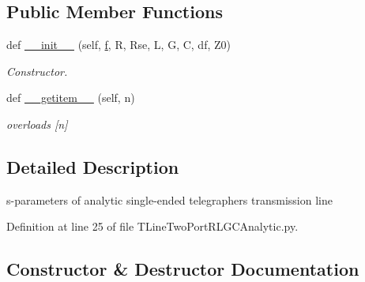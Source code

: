 \subsection*{Public Member Functions}
\begin{DoxyCompactItemize}
\item 
def \hyperlink{classSignalIntegrity_1_1SParameters_1_1Devices_1_1TLineTwoPortRLGCAnalytic_1_1TLineTwoPortRLGCAnalytic_a7bb4433ce4f16bca3d1fba761e3a1f9c}{\+\_\+\+\_\+init\+\_\+\+\_\+} (self, \hyperlink{classSignalIntegrity_1_1SParameters_1_1SParameters_1_1SParameters_a32e7a34d6837fe949b413c852a0447f8}{f}, R, Rse, L, G, C, df, Z0)
\begin{DoxyCompactList}\small\item\em Constructor. \end{DoxyCompactList}\item 
def \hyperlink{classSignalIntegrity_1_1SParameters_1_1Devices_1_1TLineTwoPortRLGCAnalytic_1_1TLineTwoPortRLGCAnalytic_ab7a6da5139e0878b590d68292aaa70f2}{\+\_\+\+\_\+getitem\+\_\+\+\_\+} (self, n)
\begin{DoxyCompactList}\small\item\em overloads \mbox{[}n\mbox{]} \end{DoxyCompactList}\end{DoxyCompactItemize}


\subsection{Detailed Description}
s-\/parameters of analytic single-\/ended telegraphers transmission line 

Definition at line 25 of file T\+Line\+Two\+Port\+R\+L\+G\+C\+Analytic.\+py.



\subsection{Constructor \& Destructor Documentation}
\mbox{\label{classSignalIntegrity_1_1SParameters_1_1Devices_1_1TLineTwoPortRLGCAnalytic_1_1TLineTwoPortRLGCAnalytic_a7bb4433ce4f16bca3d1fba761e3a1f9c}} 
